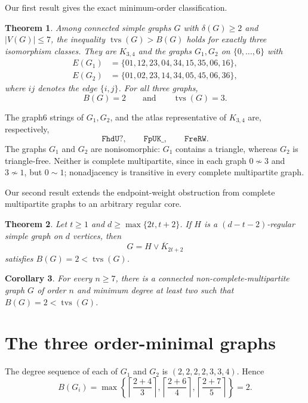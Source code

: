\documentclass[11pt]{amsart}
\newtheorem{theorem}{Theorem}
\newtheorem{corollary}[theorem]{Corollary}
\newcommand{\tvs}{\operatorname{tvs}}
\begin{document}
Our first result gives the exact minimum-order classification.

\begin{theorem}\label{thm:classification}
Among connected simple graphs $G$ with $\delta(G)\ge2$ and $|V(G)|\le7$,
the inequality $\tvs(G)>B(G)$ holds for exactly three isomorphism classes.
They are $K_{3,4}$ and the graphs $G_1,G_2$ on $\{0,\ldots,6\}$ with
\begin{align*}
E(G_1)&=\{01,12,23,04,34,15,35,06,16\},\\
E(G_2)&=\{01,02,23,14,34,05,45,06,36\},
\end{align*}
where $ij$ denotes the edge $\{i,j\}$. For all three graphs,
\[
  B(G)=2
  \qquad\text{and}\qquad
  \tvs(G)=3.
\]
\end{theorem}

The graph6 strings of $G_1,G_2$, and the atlas representative of
$K_{3,4}$ are, respectively,
\[
  \texttt{FhdU?},\qquad
  \texttt{FpUK\_},\qquad
  \texttt{FreRW}.
\]
The graphs $G_1$ and $G_2$ are nonisomorphic: $G_1$ contains a triangle,
whereas $G_2$ is triangle-free. Neither is complete multipartite, since in
each graph $0\not\sim3$ and $3\not\sim1$, but $0\sim1$; nonadjacency is
transitive in every complete multipartite graph.

Our second result extends the endpoint-weight obstruction from complete
multipartite graphs to an arbitrary regular core.

\begin{theorem}\label{thm:family}
Let $t\ge1$ and $d\ge\max\{2t,t+2\}$. If $H$ is a
$(d-t-2)$-regular simple graph on $d$ vertices, then
\[
  G=H\vee\overline{K}_{2t+2}
\]
satisfies $B(G)=2<\tvs(G)$.
\end{theorem}

\begin{corollary}\label{cor:orders}
For every $n\ge7$, there is a connected non-complete-multipartite graph
$G$ of order $n$ and minimum degree at least two such that
$B(G)=2<\tvs(G)$.
\end{corollary}

\section{The three order-minimal graphs}

The degree sequence of each of $G_1$ and $G_2$ is
$(2,2,2,2,3,3,4)$. Hence
\[
 B(G_i)=\max\left\{
 \left\lceil\frac{2+4}{3}\right\rceil,
 \left\lceil\frac{2+6}{4}\right\rceil,
 \left\lceil\frac{2+7}{5}\right\rceil
 \right\}=2.
\]
\end{document}

